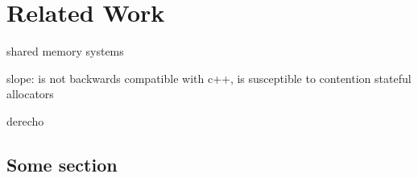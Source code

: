 \chapter{Related Work}
\label{chap:related}

shared memory systems

slope: is not backwards compatible with c++, is susceptible to contention
stateful allocators

derecho


\section{Some section}
